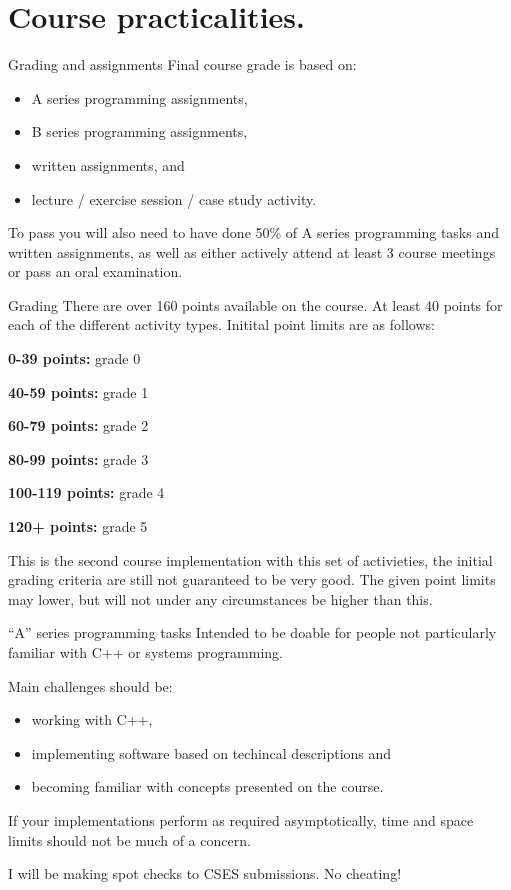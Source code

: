 \documentclass[11pt, aspectratio=169, table]{beamer}
\begin{document}
\section{Course practicalities.}
\begin{frame}{Grading and assignments}
\setlength\parskip{\fill}
Final course grade is based on:
\begin{itemize}
	\item A series programming assignments,
	\item B series programming assignments,
	\item written assignments, and
	\item lecture / exercise session / case study activity.
\end{itemize}

To pass you will also need to have done 50\% of A series programming tasks and written 
assignments, as well as either actively attend at least 3 course meetings or pass an oral 
examination.
\end{frame}

\begin{frame}{Grading}
There are over 160 points available on the course. At least 40 points for each of the different
activity types. Initital point limits are as follows:
\begin{description}
\item{{\bf 0-39 points:}} grade 0
\item{{\bf 40-59 points:}} grade 1
\item{{\bf 60-79 points:}} grade 2
\item{{\bf 80-99 points:}} grade 3
\item{{\bf 100-119 points:}} grade 4
\item{{\bf 120+ points:}} grade 5
\end{description}

This is the second course implementation with this set of activieties, the initial grading criteria 
are still not guaranteed to be very good. The given point limits may lower, but will not under any 
circumstances be higher than this.
\end{frame}

\begin{frame}{``A'' series programming tasks}
\setlength\parskip{\fill}
Intended to be doable for people not particularly familiar with C++ or systems programming.

Main challenges should be:
\begin{itemize}
	\item working with C++,
	\item implementing software based on techincal descriptions and
	\item becoming familiar with concepts presented on the course.
\end{itemize}

If your implementations perform as required asymptotically, time and space limits should not be much of a concern.

I will be making spot checks to CSES submissions. No cheating!
\end{frame}
\end{document}
